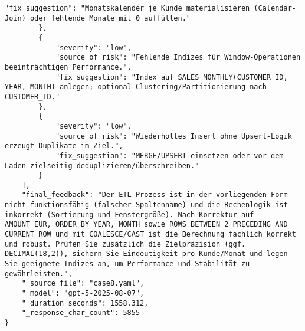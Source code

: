 \begin{lstlisting}[caption={Ausgabe: GPT-5 Anwendungsfall 8 Konsistenzdurchlauf},label={gpt_case8_prompt2}]
            "fix_suggestion": "Monatskalender je Kunde materialisieren (Calendar-Join) oder fehlende Monate mit 0 auffüllen."
        },
        {
            "severity": "low",
            "source_of_risk": "Fehlende Indizes für Window-Operationen beeinträchtigen Performance.",
            "fix_suggestion": "Index auf SALES_MONTHLY(CUSTOMER_ID, YEAR, MONTH) anlegen; optional Clustering/Partitionierung nach CUSTOMER_ID."
        },
        {
            "severity": "low",
            "source_of_risk": "Wiederholtes Insert ohne Upsert-Logik erzeugt Duplikate im Ziel.",
            "fix_suggestion": "MERGE/UPSERT einsetzen oder vor dem Laden zielseitig deduplizieren/überschreiben."
        }
    ],
    "final_feedback": "Der ETL-Prozess ist in der vorliegenden Form nicht funktionsfähig (falscher Spaltenname) und die Rechenlogik ist inkorrekt (Sortierung und Fenstergröße). Nach Korrektur auf AMOUNT_EUR, ORDER BY YEAR, MONTH sowie ROWS BETWEEN 2 PRECEDING AND CURRENT ROW und mit COALESCE/CAST ist die Berechnung fachlich korrekt und robust. Prüfen Sie zusätzlich die Zielpräzision (ggf. DECIMAL(18,2)), sichern Sie Eindeutigkeit pro Kunde/Monat und legen Sie geeignete Indizes an, um Performance und Stabilität zu gewährleisten.",
    "_source_file": "case8.yaml",
    "_model": "gpt-5-2025-08-07",
    "_duration_seconds": 1558.312,
    "_response_char_count": 5855
}
\end{lstlisting}

